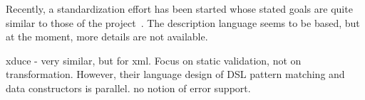 Recently, a standardization effort has been started whose stated goals
are quite similar to those of the \pads{} project~\cite{dfdl}. The
description language seems to be \xml{} based, but at the moment, more
details are not available.

xduce - very similar, but for xml. Focus on static validation, not on
transformation. However, their language design of DSL pattern matching
and data constructors is parallel. no notion of error support.

